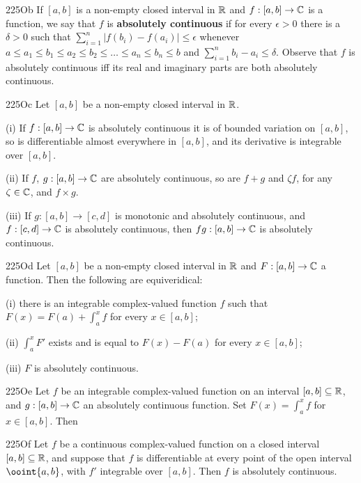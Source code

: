 \spheader 225Ob If $[a,b]$ is a non-empty
closed interval in $\Bbb R$ and $f:[a,b]\to\Bbb C$ is a function, we say
that $f$ is {\bf absolutely continuous} if for every $\epsilon>0$ there
is a $\delta>0$ such that $\sum_{i=1}^n|f(b_i)-f(a_i)|\le\epsilon$
whenever $a\le a_1\le b_1\le a_2\le b_2\le\ldots\le a_n\le b_n\le b$ and
$\sum_{i=1}^nb_i-a_i\le\delta$.   Observe that $f$ is absolutely
continuous iff its real and imaginary parts are both absolutely
continuous.

\spheader 225Oc Let $[a,b]$ be a non-empty closed interval in
$\Bbb R$.

\quad(i) If $f:[a,b]\to\Bbb C$ is absolutely continuous it is of bounded
variation on $[a,b]$, so is differentiable almost everywhere in $[a,b]$,
and its derivative is integrable over $[a,b]$.

\quad(ii) If $f$, $g:[a,b]\to\Bbb C$ are absolutely continuous, so are
$f+g$ and $\zeta f$, for any $\zeta\in\Bbb C$, and $f\times g$.

\quad(iii) If $g:[a,b]\to[c,d]$ is monotonic and absolutely continuous,
and
$f:[c,d]\to\Bbb C$ is absolutely continuous, then $fg:[a,b]\to\Bbb C$ is
absolutely continuous.

\spheader 225Od Let $[a,b]$ be a non-empty closed interval in
$\Bbb R$ and $F:[a,b]\to\Bbb C$ a function.   Then the following are
equiveridical:

\quad(i) there is an integrable complex-valued function $f$ such that
$F(x)=F(a)+\int_a^xf$ for every $x\in[a,b]$;

\quad(ii) $\int_a^xF'$ exists and is
equal to $F(x)-F(a)$ for every $x\in[a,b]$;

\quad(iii) $F$ is absolutely continuous.


\spheader 225Oe Let $f$ be an integrable complex-valued function
on an interval $[a,b]\subseteq\Bbb R$, and $g:[a,b]\to\Bbb C$ an
absolutely continuous function.   Set $F(x)=\int_a^xf$ for $x\in[a,b]$.
Then



\spheader 225Of Let $f$ be a continuous complex-valued function
on a closed interval $[a,b]\subseteq\Bbb R$, and suppose that $f$ is
differentiable at every point of the open interval $\ooint{a,b}$, with
$f'$ integrable over $[a,b]$.   Then $f$ is absolutely continuous.

